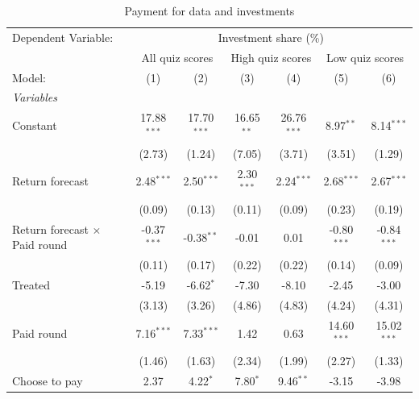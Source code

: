 \begin{table}[htbp]
   \caption{Payment for data and investments}
   \centering
   \begin{tabular}{lcccccc}
      \tabularnewline \midrule \midrule
      Dependent Variable: & \multicolumn{6}{c}{Investment share (\%)}\\
       & \multicolumn{2}{c}{All quiz scores} & \multicolumn{2}{c}{High quiz scores} & \multicolumn{2}{c}{Low quiz scores} \\ 
      Model:                               & (1)           & (2)           & (3)           & (4)           & (5)           & (6)\\  
      \midrule
      \emph{Variables}\\
      Constant                             & 17.88$^{***}$ & 17.70$^{***}$ & 16.65$^{**}$  & 26.76$^{***}$ & 8.97$^{**}$   & 8.14$^{***}$\\   
                                           & (2.73)        & (1.24)        & (7.05)        & (3.71)        & (3.51)        & (1.29)\\   
      Return forecast                      & 2.48$^{***}$  & 2.50$^{***}$  & 2.30$^{***}$  & 2.24$^{***}$  & 2.68$^{***}$  & 2.67$^{***}$\\   
                                           & (0.09)        & (0.13)        & (0.11)        & (0.09)        & (0.23)        & (0.19)\\   
      Return forecast $\times$ Paid round  & -0.37$^{***}$ & -0.38$^{**}$  & -0.01         & 0.01          & -0.80$^{***}$ & -0.84$^{***}$\\   
                                           & (0.11)        & (0.17)        & (0.22)        & (0.22)        & (0.14)        & (0.09)\\   
      Treated                              & -5.19         & -6.62$^{*}$   & -7.30         & -8.10         & -2.45         & -3.00\\   
                                           & (3.13)        & (3.26)        & (4.86)        & (4.83)        & (4.24)        & (4.31)\\   
      Paid round                           & 7.16$^{***}$  & 7.33$^{***}$  & 1.42          & 0.63          & 14.60$^{***}$ & 15.02$^{***}$\\   
                                           & (1.46)        & (1.63)        & (2.34)        & (1.99)        & (2.27)        & (1.33)\\   
      Choose to pay                        & 2.37          & 4.22$^{*}$    & 7.80$^{*}$    & 9.46$^{**}$   & -3.15         & -3.98\\   

\end{tabular}
\end{table}
